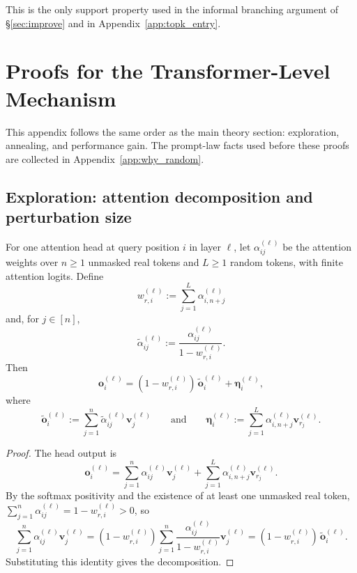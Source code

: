 This is the only support property used in the informal branching argument of \S\ref{sec:improve} and in Appendix~\ref{app:topk_entry}.

\section{Proofs for the Transformer-Level Mechanism}\label{app:proofs}

This appendix follows the same order as the main theory section: exploration, annealing, and performance gain. The prompt-law facts used before these proofs are collected in Appendix~\ref{app:why_random}.

\subsection{Exploration: attention decomposition and perturbation size}\label{app:rsp_noise}

\begin{proposition}\label{prop:attention_decomposition}
For one attention head at query position $i$ in layer $\ell$, let $\alpha_{ij}^{(\ell)}$ be the attention weights over $n\ge1$ unmasked real tokens and $L\ge1$ random tokens, with finite attention logits. Define
\[
w_{r,i}^{(\ell)} := \sum_{j=1}^{L} \alpha_{i,n+j}^{(\ell)}
\]
and, for $j \in [n]$,
\[
\tilde{\alpha}_{ij}^{(\ell)} := \frac{\alpha_{ij}^{(\ell)}}{1-w_{r,i}^{(\ell)}}.
\]
Then
\[
\mathbf{o}_i^{(\ell)}
=
(1-w_{r,i}^{(\ell)})\,\tilde{\mathbf{o}}_i^{(\ell)}
+
\boldsymbol{\eta}_i^{(\ell)},
\]
where
\[
\tilde{\mathbf{o}}_i^{(\ell)} := \sum_{j=1}^{n} \tilde{\alpha}_{ij}^{(\ell)} \mathbf{v}_j^{(\ell)}
\qquad\text{and}\qquad
\boldsymbol{\eta}_i^{(\ell)} := \sum_{j=1}^{L} \alpha_{i,n+j}^{(\ell)} \mathbf{v}_{r_j}^{(\ell)}.
\]
\end{proposition}

\begin{proof}
The head output is
\[
\mathbf{o}_i^{(\ell)}
=
\sum_{j=1}^{n} \alpha_{ij}^{(\ell)} \mathbf{v}_j^{(\ell)}
+
\sum_{j=1}^{L} \alpha_{i,n+j}^{(\ell)} \mathbf{v}_{r_j}^{(\ell)}.
\]
By the softmax positivity and the existence of at least one unmasked real token, $\sum_{j=1}^{n} \alpha_{ij}^{(\ell)} = 1-w_{r,i}^{(\ell)} > 0$, so
\[
\sum_{j=1}^{n} \alpha_{ij}^{(\ell)} \mathbf{v}_j^{(\ell)}
=
(1-w_{r,i}^{(\ell)}) \sum_{j=1}^{n} \frac{\alpha_{ij}^{(\ell)}}{1-w_{r,i}^{(\ell)}} \mathbf{v}_j^{(\ell)}
=
(1-w_{r,i}^{(\ell)})\,\tilde{\mathbf{o}}_i^{(\ell)}.
\]
Substituting this identity gives the decomposition.
\end{proof}

